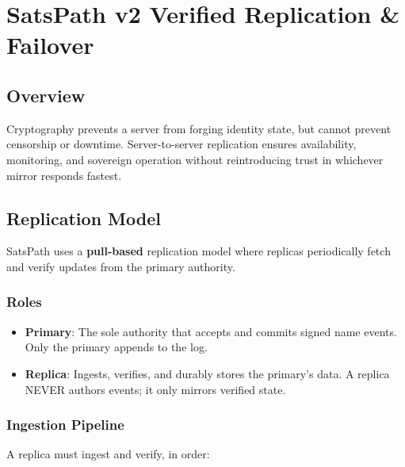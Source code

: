 \documentclass[
]{article}
\author{}
\date{}
\providecommand{\tightlist}{%
  \setlength{\itemsep}{0pt}\setlength{\parskip}{0pt}}
\begin{document}
\hypertarget{satspath-v2-verified-replication-failover}{%
\section{SatsPath v2 Verified Replication \&
Failover}\label{satspath-v2-verified-replication-failover}}

\hypertarget{overview}{%
\subsection{Overview}\label{overview}}

Cryptography prevents a server from forging identity state, but cannot
prevent censorship or downtime. Server-to-server replication ensures
availability, monitoring, and sovereign operation without reintroducing
trust in whichever mirror responds fastest.

\hypertarget{replication-model}{%
\subsection{Replication Model}\label{replication-model}}

SatsPath uses a \textbf{pull-based} replication model where replicas
periodically fetch and verify updates from the primary authority.

\hypertarget{roles}{%
\subsubsection{Roles}\label{roles}}

\begin{itemize}
\tightlist
\item
  \textbf{Primary}: The sole authority that accepts and commits signed
  name events. Only the primary appends to the log.
\item
  \textbf{Replica}: Ingests, verifies, and durably stores the primary's
  data. A replica NEVER authors events; it only mirrors verified state.
\end{itemize}

\hypertarget{ingestion-pipeline}{%
\subsubsection{Ingestion Pipeline}\label{ingestion-pipeline}}

A replica must ingest and verify, in order:
\end{document}
